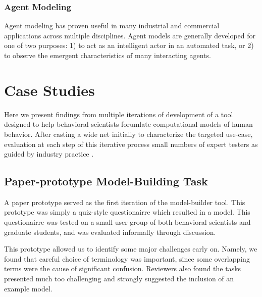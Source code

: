 \documentclass[conference]{IEEEtran}
\begin{document}
\subsubsection{Agent Modeling}
Agent modeling has proven useful in many industrial and commercial applications across multiple disciplines. \cite{metzger2011survey, macal2011introductory}
Agent models are generally developed for one of two purposes: 1) to act as an intelligent actor in an automated task, or 2) to observe the emergent characteristics of many interacting agents. 



\section{Case Studies}
Here we present findings from multiple iterations of development of a tool designed to help behavioral scientists forumlate computational models of human behavior.
After casting a wide net initially to characterize the targeted use-case, evaluation at each step of this iterative process small numbers of expert testers as guided by industry practice \cite{nielsen2000}.

\subsection{Paper-prototype Model-Building Task}
A paper prototype served as the first iteration of the model-builder tool.
This prototype was simply a quiz-style questionairre which resulted in a model.
This questionairre was tested on a small user group of both behavioral scientists and graduate students, and was evaluated informally through discussion.

This prototype allowed us to identify some major challenges early on.
Namely, we found that careful choice of terminology was important, since some overlapping terms were the cause of significant confusion.
Reviewers also found the tasks presented much too challenging and strongly suggested the inclusion of an example model.

% 
\end{document}
